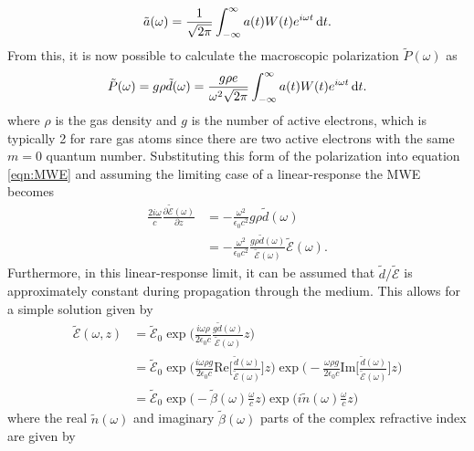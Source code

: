 \begin{equation}
	\tilde{a}(\omega)=\frac{1}{\sqrt{2\pi}}\int_{-\infty}^{\infty}a(t)W(t)e^{i\omega t}\mathop{}\!\mathrm{d} t.
\end{equation}
From this, it is now possible to calculate the macroscopic polarization $\tilde{P}(\omega)$ as 
\begin{equation}
	\tilde{P}(\omega)=g\rho\tilde{d}(\omega)=\frac{g\rho e}{\omega^2\sqrt{2\pi}} \int_{-\infty}^{\infty}a(t)W(t)e^{i\omega t}\mathop{}\!\mathrm{d} t.
\end{equation}
where $\rho$ is the gas density and $g$ is the number of active electrons, which is typically 2 for rare gas atoms since there are two active electrons with the same $m=0$ quantum number.  Substituting this form of the polarization into equation \ref{eqn:MWE} and assuming the limiting case of a linear-response the MWE becomes
\begin{equation}
	\label{eqn:MWE_linear_resp}
	\begin{aligned}
		\frac{2i\omega}{c}\frac{\partial \tilde{\mathcal{E}}(\omega)}{\partial z} &= -\frac{\omega^2}{\epsilon_0 c^2} g\rho \tilde{d}(\omega)\\
		& = -\frac{\omega^2}{\epsilon_0 c^2} \frac{g\rho \tilde{d}(\omega)}{\tilde{\mathcal{E}}(\omega)}\tilde{\mathcal{E}}(\omega).
	\end{aligned}
\end{equation}
Furthermore, in this linear-response limit, it can be assumed that $\tilde{d}/\tilde{\mathcal{E}}$ is approximately constant during propagation through the medium.  This allows for a simple solution given by
\begin{equation}
	\label{eqn:E_solution_MWE}
	\begin{aligned}
		\tilde{\mathcal{E}}(\omega,z) &= \tilde{\mathcal{E}}_0 \exp\Bigg({\frac{i\omega\rho}{2\epsilon_0 c} \frac{g\tilde{d}(\omega)}{\tilde{\mathcal{E}}(\omega)} z}\Bigg)\\
		&=\tilde{\mathcal{E}}_0 \exp\Bigg({\frac{i\omega\rho g}{2\epsilon_0 c} \mathrm{Re}\bigg[\frac{\tilde{d}(\omega)}{\tilde{\mathcal{E}}(\omega)}\bigg]z}\Bigg) \exp\Bigg(- {\frac{\omega\rho g}{2\epsilon_0 c} \mathrm{Im}\bigg[\frac{\tilde{d}(\omega)}{\tilde{\mathcal{E}}(\omega)}\bigg]z}\Bigg)\\
		&=\tilde{\mathcal{E}}_0 \exp\bigg(-\tilde{\beta}(\omega)\frac{\omega}{c}z\bigg) \exp\bigg( i\tilde{n}(\omega) \frac{\omega}{c} z\bigg)
	\end{aligned}
\end{equation}
where the real $\tilde{n}(\omega)$ and imaginary $\tilde{\beta}(\omega)$ parts of the complex refractive index are given by
